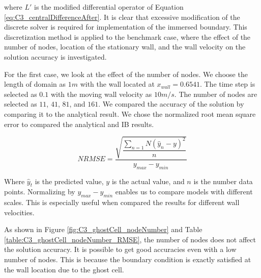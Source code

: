 where $L'$ is the modified differential operator of Equation \eqref{eq:C3_centralDifferenceAfter}. It is clear that excessive modification of the discrete solver is required for implementation of the immersed boundary. This discretization method is applied to the benchmark case, where the effect of the number of nodes, location of the stationary wall, and the wall velocity on the solution accuracy is investigated.

For the first case, we look at the effect of the number of nodes. We choose the length of domain as $1m$ with the wall located at $x_{wall} = 0.6541$. The time step is selected as $0.1$ with the moving wall velocity as $10 m/s$. The number of nodes are selected as $11$, $41$, $81$, and $161$. We compared the accuracy of the solution by comparing it to the analytical result. We chose the normalized root mean square error to compared the analytical and IB results.

\begin{equation*}
    NRMSE = \dfrac{\sqrt{\dfrac{\sum_{n=1}{N} \left( \hat{y}_n - y \right)^2}{n}}}{y_{max} - y_{min}}
\end{equation*}

Where $\hat{y}_t$ is the predicted value, $y$ is the actual value, and $n$ is the number data points. Normalizing by $y_{max} - y_{min}$ enables us to compare models with different scales. This is especially useful when compared the results for different wall velocities.

As shown in Figure \ref{fig:C3_ghostCell_nodeNumber} and Table \ref{table:C3_ghostCell_nodeNumber_RMSE}, the number of nodes does not affect the solution accuracy. It is possible to get good accuracies even with a low number of nodes. This is because the boundary condition is exactly satisfied at the wall location due to the ghost cell.

